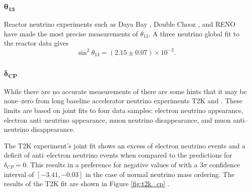 \subsubsection*{$\boldsymbol{\theta_{13}}$}

Reactor neutrino experiments such as Daya Bay \cite{An:2012eh}, Double Chooz
\cite{Abe:2013sxa}, and RENO \cite{Ahn:2012nd} have made the most precise measurements of
$\theta_{13}$. A three neutrino global fit to the reactor data gives 
\cite{Capozzi:2016rtj}
\begin{equation}
	\sin^2 \theta_{13} = (2.15 \pm 0.07) \times 10^{-2}.
	\label{eqn:theta_13}
\end{equation}


\subsubsection*{$\boldsymbol{\delta_{CP}}$}
While there are no accurate measurements of \dcp{} there are some hints that it
may be none--zero from long baseline accelerator neutrino experiments T2K and
\nova{}. These limits are based on joint fits to four data samples: electron
neutrino appearance, electron anti--neutrino appearance, muon neutrino
disappearance, and muon anti--neutrino disappearance.

The T2K experiment's joint fit shows an excess of electron neutrino events and 
a deficit of anti--electron neutrino events when compared to the predictions 
for \(\delta_{CP} = 0\). This results in a preference for negative values of 
\dcp{} with a \(3\sigma\) confidence interval of \([-3.41, -0.03]\) in the 
case of normal neutrino mass ordering. The results of the T2K fit are shown 
in Figure \ref{fig:t2k_cp} \cite{Abe2019}.

